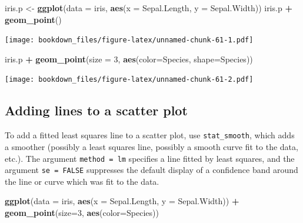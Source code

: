\documentclass[
]{krantz}
\makeatletter
\newenvironment{Shaded}{\begin{snugshade}}{\end{snugshade}}
\newcommand{\DataTypeTok}[1]{\textcolor[rgb]{0.27,0.27,0.27}{#1}}
\newcommand{\DecValTok}[1]{\textcolor[rgb]{0.06,0.06,0.06}{#1}}
\newcommand{\KeywordTok}[1]{\textcolor[rgb]{0.27,0.27,0.27}{\textbf{#1}}}
\newcommand{\NormalTok}[1]{#1}
\newcommand{\OperatorTok}[1]{\textcolor[rgb]{0.43,0.43,0.43}{\textbf{#1}}}
\newcommand{\StringTok}[1]{\textcolor[rgb]{0.5,0.5,0.5}{#1}}
\newenvironment{kframe}{%
\medskip{}
\setlength{\fboxsep}{.8em}
 \def\at@end@of@kframe{}%
 \ifinner\ifhmode%
  \def\at@end@of@kframe{\end{minipage}}%
  \begin{minipage}{\columnwidth}%
 \fi\fi%
 \def\FrameCommand##1{\hskip\@totalleftmargin \hskip-\fboxsep
 \colorbox{shadecolor}{##1}\hskip-\fboxsep
     \hskip-\linewidth \hskip-\@totalleftmargin \hskip\columnwidth}%
 \MakeFramed {\advance\hsize-\width
   \@totalleftmargin\z@ \linewidth\hsize
   \@setminipage}}%
 {\par\unskip\endMakeFramed%
 \at@end@of@kframe}
\renewenvironment{Shaded}{\begin{kframe}}{\end{kframe}}
\makeatother
\begin{document}
\begin{Shaded}
\begin{Highlighting}[]
\NormalTok{iris.p \textless{}{-}}\StringTok{ }\KeywordTok{ggplot}\NormalTok{(}\DataTypeTok{data =}\NormalTok{ iris, }\KeywordTok{aes}\NormalTok{(}\DataTypeTok{x =}\NormalTok{ Sepal.Length, }\DataTypeTok{y =}\NormalTok{ Sepal.Width)) }
\NormalTok{iris.p }\OperatorTok{+}\StringTok{ }\KeywordTok{geom\_point}\NormalTok{()}
\end{Highlighting}
\end{Shaded}

\texttt{[image: bookdown\_files/figure-latex/unnamed-chunk-61-1.pdf]}

\begin{Shaded}
\begin{Highlighting}[]
\NormalTok{iris.p }\OperatorTok{+}\StringTok{ }\KeywordTok{geom\_point}\NormalTok{(}\DataTypeTok{size =} \DecValTok{3}\NormalTok{, }\KeywordTok{aes}\NormalTok{(}\DataTypeTok{color=}\NormalTok{Species, }\DataTypeTok{shape=}\NormalTok{Species))}
\end{Highlighting}
\end{Shaded}

\texttt{[image: bookdown\_files/figure-latex/unnamed-chunk-61-2.pdf]}

\hypertarget{adding-lines-to-a-scatter-plot}{%
\subsection{Adding lines to a scatter plot}\label{adding-lines-to-a-scatter-plot}}

To add a fitted least squares line to a scatter plot, use \texttt{stat\_smooth}, which adds a smoother (possibly a least squares line, possibly a smooth curve fit to the data, etc.). The argument \texttt{method\ =\ lm} specifies a line fitted by least squares, and the argument \texttt{se\ =\ FALSE} suppresses the default display of a confidence band around the line or curve which was fit to the data.

\begin{Shaded}
\begin{Highlighting}[]
\KeywordTok{ggplot}\NormalTok{(}\DataTypeTok{data =}\NormalTok{ iris, }\KeywordTok{aes}\NormalTok{(}\DataTypeTok{x =}\NormalTok{ Sepal.Length, }\DataTypeTok{y =}\NormalTok{ Sepal.Width)) }\OperatorTok{+}\StringTok{ }
\StringTok{    }\KeywordTok{geom\_point}\NormalTok{(}\DataTypeTok{size=}\DecValTok{3}\NormalTok{, }\KeywordTok{aes}\NormalTok{(}\DataTypeTok{color=}\NormalTok{Species))}
\end{Highlighting}
\end{Shaded}
\end{document}
